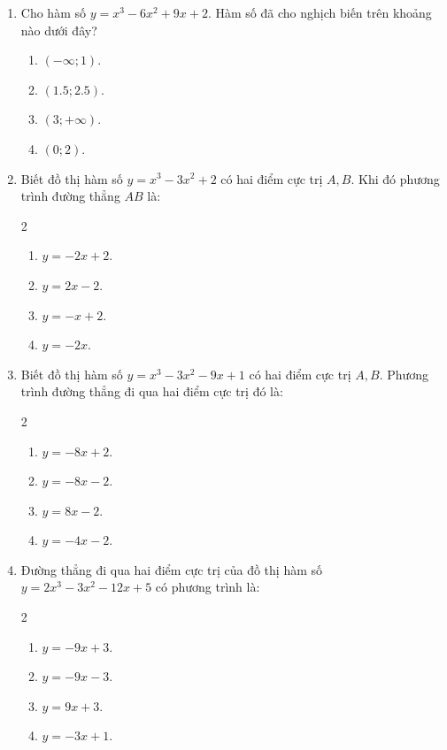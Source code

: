 \documentclass[12pt]{article}
\begin{document}
\begin{enumerate}[label=\textbf{Câu \arabic*.}]
		\item Cho hàm số $y = x^3 - 6x^2 + 9x + 2$. Hàm số đã cho nghịch biến trên khoảng nào dưới đây?
		\begin{enumerate}[label=\textbf{\Alph*.}]
			\item $(-\infty; 1)$.
			\item $(1.5; 2.5)$.
			\item $(3; +\infty)$.
			\item $(0; 2)$.
		\end{enumerate}
		
		\item Biết đồ thị hàm số $y = x^3 - 3x^2 + 2$ có hai điểm cực trị $A, B$. Khi đó phương trình đường thẳng $AB$ là:
		\begin{multicols}{2}
			\begin{enumerate}[label=\textbf{\Alph*.}]
				\item $y = -2x + 2$.
				\item $y = 2x - 2$.
				\item $y = -x + 2$.
				\item $y = -2x$.
			\end{enumerate}
		\end{multicols}
		
		\item Biết đồ thị hàm số $y = x^3 - 3x^2 - 9x + 1$ có hai điểm cực trị $A, B$. Phương trình đường thẳng đi qua hai điểm cực trị đó là:
		\begin{multicols}{2}
			\begin{enumerate}[label=\textbf{\Alph*.}]
				\item $y = -8x + 2$.
				\item $y = -8x - 2$.
				\item $y = 8x - 2$.
				\item $y = -4x - 2$.
			\end{enumerate}
		\end{multicols}
		
		\item Đường thẳng đi qua hai điểm cực trị của đồ thị hàm số $y = 2x^3 - 3x^2 - 12x + 5$ có phương trình là:
		\begin{multicols}{2}
			\begin{enumerate}[label=\textbf{\Alph*.}]
				\item $y = -9x + 3$.
				\item $y = -9x - 3$.
				\item $y = 9x + 3$.
				\item $y = -3x + 1$.
			\end{enumerate}
		\end{multicols}
		

\end{enumerate}
\end{document}
